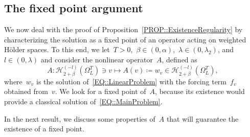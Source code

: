\documentclass[12pt,a4paper]{amsart}
\numberwithin{equation}{section}
\theoremstyle{definition}
\theoremstyle{remark}
\begin{document}
\subsection{The fixed point argument}
We now deal with the proof of Proposition~\ref{PROP::ExistenceRegularity} by characterizing the solution as a fixed point of an operator acting on weighted Hölder spaces. To this end, we let~$T > 0$,~$\beta \in (0,\alpha)$,~$\lambda \in(0,\lambda_2)$, and~$l \in (0,\lambda)$ and consider the nonlinear operator~$A$, defined as
\begin{equation}
    A \colon \mathcal{H}_{2+\beta}^{(-l)}\left(\Omega_L^T\right) \ni v \longmapsto A(v) \coloneq w_v \in \mathcal{H}_{2+\beta}^{(-l)}\left(\Omega_L^T\right),
\end{equation}
where~$w_v$ is the solution of~\eqref{EQ::LinearProblem} with the forcing term~$f_v$ obtained from~$v$. We look for a fixed point of~$A$, because its existence would provide a classical solution of~\eqref{EQ::MainProblem}.

In the next result, we discuss some properties of~$A$ that will guarantee the existence of a fixed point.
\end{document}
